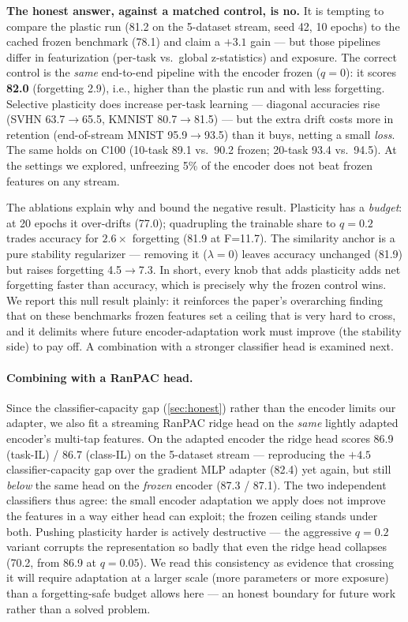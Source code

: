 \documentclass{article} %
\begin{document}
\textbf{The honest answer, against a matched control, is no.} It is tempting to
compare the plastic run (81.2 on the 5-dataset stream, seed 42, 10 epochs) to
the cached frozen benchmark (78.1) and claim a $+3.1$ gain --- but those
pipelines differ in featurization (per-task vs.\ global z-statistics) and
exposure. The correct control is the \emph{same} end-to-end pipeline with the
encoder frozen ($q{=}0$): it scores \textbf{82.0} (forgetting 2.9), i.e.,
higher than the plastic run and with less forgetting. Selective plasticity does
increase per-task learning --- diagonal accuracies rise (SVHN 63.7$\to$65.5,
KMNIST 80.7$\to$81.5) --- but the extra drift costs more in retention
(end-of-stream MNIST 95.9$\to$93.5) than it buys, netting a small \emph{loss}.
The same holds on C100 (10-task 89.1 vs.\ 90.2 frozen; 20-task 93.4 vs.\ 94.5).
At the settings we explored, unfreezing 5\% of the encoder does not beat frozen
features on any stream.

The ablations explain why and bound the negative result. Plasticity has a
\emph{budget}: at 20 epochs it over-drifts (77.0); quadrupling the trainable
share to $q{=}0.2$ trades accuracy for $2.6\times$ forgetting (81.9 at F=11.7).
The similarity anchor is a pure stability regularizer --- removing it
($\lambda{=}0$) leaves accuracy unchanged (81.9) but raises forgetting
4.5$\to$7.3. In short, every knob that adds plasticity adds net forgetting
faster than accuracy, which is precisely why the frozen control wins. We
report this null result plainly: it reinforces the paper's overarching finding
that on these benchmarks frozen features set a ceiling that is very hard to
cross, and it delimits where future encoder-adaptation work must improve (the
stability side) to pay off. A combination with a stronger classifier head is
examined next.

\paragraph{Combining with a RanPAC head.} Since the classifier-capacity gap
(\cref{sec:honest}) rather than the encoder limits our adapter, we also fit a
streaming RanPAC ridge head on the \emph{same} lightly adapted encoder's
multi-tap features. On the adapted encoder the ridge head scores 86.9 (task-IL)
/ 86.7 (class-IL) on the 5-dataset stream --- reproducing the $+4.5$
classifier-capacity gap over the gradient MLP adapter (82.4) yet again, but
still \emph{below} the same head on the \emph{frozen} encoder (87.3 / 87.1).
The two independent classifiers thus agree: the small encoder adaptation we
apply does not improve the features in a way either head can exploit; the
frozen ceiling stands under both. Pushing plasticity harder is actively
destructive --- the aggressive $q{=}0.2$ variant corrupts the representation so
badly that even the ridge head collapses (70.2, from 86.9 at $q{=}0.05$). We read this consistency as evidence that
crossing it will require adaptation at a larger scale (more parameters or more
exposure) than a forgetting-safe budget allows here --- an honest boundary for
future work rather than a solved problem.
\end{document}
